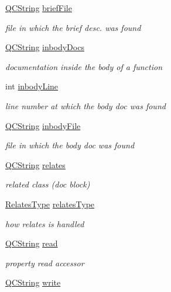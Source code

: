 \begin{DoxyCompactItemize}
\hyperlink{class_q_c_string}{Q\+C\+String} \hyperlink{class_entry_a9a0b7ed65e6082088ededf633771d3d1}{brief\+File}
\begin{DoxyCompactList}\small\item\em file in which the brief desc. was found \end{DoxyCompactList}\item 
\hyperlink{class_q_c_string}{Q\+C\+String} \hyperlink{class_entry_a51e209dbd21d11b0c63d246efa6182f2}{inbody\+Docs}
\begin{DoxyCompactList}\small\item\em documentation inside the body of a function \end{DoxyCompactList}\item 
int \hyperlink{class_entry_a8eed853bf654e1d583e10f04062ccdde}{inbody\+Line}
\begin{DoxyCompactList}\small\item\em line number at which the body doc was found \end{DoxyCompactList}\item 
\hyperlink{class_q_c_string}{Q\+C\+String} \hyperlink{class_entry_aee8cba460792393b5051230c78fbb204}{inbody\+File}
\begin{DoxyCompactList}\small\item\em file in which the body doc was found \end{DoxyCompactList}\item 
\hyperlink{class_q_c_string}{Q\+C\+String} \hyperlink{class_entry_a611ec017dea1768b7093bea6e4177cba}{relates}
\begin{DoxyCompactList}\small\item\em related class (doc block) \end{DoxyCompactList}\item 
\hyperlink{types_8h_aa370e9ca1d3ff266cab92689bcc37d9e}{Relates\+Type} \hyperlink{class_entry_a74ff1e30a3ed19f82ce61f70b8a5a413}{relates\+Type}
\begin{DoxyCompactList}\small\item\em how relates is handled \end{DoxyCompactList}\item 
\hyperlink{class_q_c_string}{Q\+C\+String} \hyperlink{class_entry_ac5ad6c6585645a4427b54e5281316b65}{read}
\begin{DoxyCompactList}\small\item\em property read accessor \end{DoxyCompactList}\item 
\hyperlink{class_q_c_string}{Q\+C\+String} \hyperlink{class_entry_a76a68a1f14534f069444ba2704ef7404}{write}

\end{DoxyCompactItemize}
